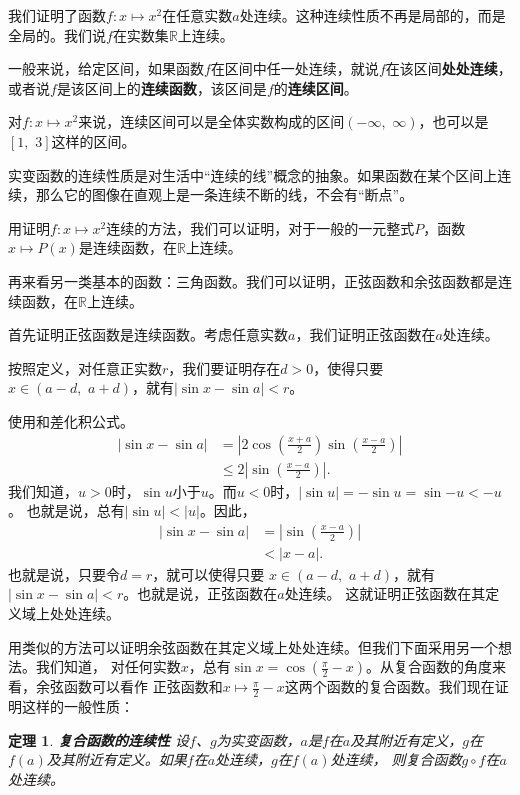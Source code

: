 \documentclass[12pt,UTF8]{ctexbook}
\newtheorem{tm}{定理}[section]
\begin{document}
我们证明了函数$f:x\mapsto x^2$在任意实数$a$处连续。这种连续性质不再是局部的，而是全局的。我们说$f$在实数集$\mathbb{R}$上连续。

一般来说，给定区间，如果函数$f$在区间中任一处连续，就说$f$在该区间\textbf{处处连续}，或者说$f$是该区间上的\textbf{连续函数}，该区间是$f$的\textbf{连续区间}。

对$f:x\mapsto x^2$来说，连续区间可以是全体实数构成的区间$(-\infty,\,\,\infty)$，也可以是$[1,\,\, 3]$这样的区间。

实变函数的连续性质是对生活中“连续的线”概念的抽象。如果函数在某个区间上连续，那么它的图像在直观上是一条连续不断的线，不会有“断点”。

用证明$f:x\mapsto x^2$连续的方法，我们可以证明，对于一般的一元整式$P$，函数$x\mapsto P(x)$是连续函数，在$\mathbb{R}$上连续。

再来看另一类基本的函数：三角函数。我们可以证明，正弦函数和余弦函数都是连续函数，在$\mathbb{R}$上连续。

首先证明正弦函数是连续函数。考虑任意实数$a$，我们证明正弦函数在$a$处连续。

按照定义，对任意正实数$r$，我们要证明存在$d>0$，使得只要
$x\in(a-d,\,\,a+d)$，就有$|\sin{x} - \sin{a}| < r$。

使用和差化积公式。
\begin{align*}
    |\sin{x} - \sin{a}| &= \left|2\cos\left(\frac{x+a}{2}\right)\sin\left(\frac{x-a}{2}\right)\right|  \\
    &\leqslant 2 \left|\sin\left(\frac{x-a}{2}\right)\right|. 
\end{align*}
我们知道，$u>0$时，$\sin{u}$小于$u$。而$u<0$时，$|\sin{u}| = -\sin{u} = \sin{-u} < -u$。
也就是说，总有$|\sin{u}| < |u|$。因此，
\begin{align*}
    |\sin{x} - \sin{a}| &= \left|\sin\left(\frac{x-a}{2}\right)\right|  \\
    &<  \left|x-a\right|. 
\end{align*}
也就是说，只要令$d = r$，就可以使得只要
$x\in(a-d,\,\,a+d)$，就有$|\sin{x} - \sin{a}| < r$。也就是说，正弦函数在$a$处连续。
这就证明正弦函数在其定义域上处处连续。

用类似的方法可以证明余弦函数在其定义域上处处连续。但我们下面采用另一个想法。我们知道，
对任何实数$x$，总有$\sin{x} = \cos{\left(\frac{\pi}{2} - x\right)}$。从复合函数的角度来看，余弦函数可以看作
正弦函数和$x\mapsto \frac{\pi}{2} - x$这两个函数的复合函数。我们现在证明这样的一般性质：

\begin{tm}{\textbf{复合函数的连续性}}
    设$f$、$g$为实变函数，$a$是$f$在$a$及其附近有定义，$g$在$f(a)$及其附近有定义。如果$f$在$a$处连续，$g$在$f(a)$处连续，
    则复合函数$g\circ f$在$a$处连续。
\end{tm}
\end{document}
